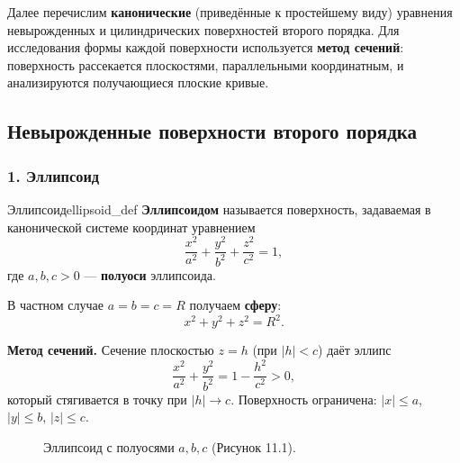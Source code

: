 \documentclass[12pt,a4paper]{article}
\begin{document}
Далее перечислим \textbf{канонические} (приведённые к простейшему
виду) уравнения невырожденных и цилиндрических поверхностей второго
порядка. Для исследования формы каждой поверхности используется
\textbf{метод сечений}: поверхность рассекается плоскостями,
параллельными координатным, и анализируются получающиеся плоские
кривые.

\subsection*{Невырожденные поверхности второго порядка}

\subsubsection*{1. Эллипсоид}

\begin{definition}{Эллипсоид}{ellipsoid_def}
  \textbf{Эллипсоидом} называется поверхность, задаваемая в
  канонической системе координат уравнением
  \begin{equation}
    \frac{x^2}{a^2} + \frac{y^2}{b^2} + \frac{z^2}{c^2} = 1, \tag{11.3}
  \end{equation}
  где $a, b, c > 0$ — \textbf{полуоси} эллипсоида.

  В частном случае $a = b = c = R$ получаем \textbf{сферу}:
  \begin{equation}
    x^2 + y^2 + z^2 = R^2. \tag{11.4}
  \end{equation}

  \textbf{Метод сечений.} Сечение плоскостью $z = h$ (при $|h| < c$)
  даёт эллипс
  \[
    \frac{x^2}{a^2} + \frac{y^2}{b^2} = 1 - \frac{h^2}{c^2} > 0,
  \]
  который стягивается в точку при $|h| \to c$. Поверхность
  ограничена: $|x| \le a$, $|y| \le b$, $|z| \le c$.
\end{definition}

\begin{figure}[h!]
  \centering
  \caption{Эллипсоид с полуосями $a, b, c$ (Рисунок 11.1).}
  \label{fig:ellipsoid}
\end{figure}
\end{document}
